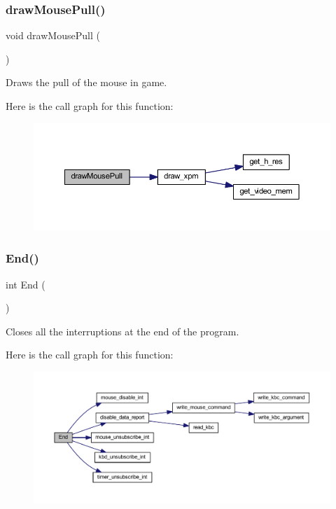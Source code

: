 \subsubsection{\texorpdfstring{drawMousePull()}{drawMousePull()}}
{\footnotesize\ttfamily void draw\+Mouse\+Pull (\begin{DoxyParamCaption}{ }\end{DoxyParamCaption})}



Draws the pull of the mouse in game. 

Here is the call graph for this function\+:
\nopagebreak
\begin{figure}[H]
\begin{center}
\leavevmode
\includegraphics[width=350pt]{group__game_ga072809b49225566117672a2ec734b2cc_cgraph}
\end{center}
\end{figure}
\mbox{\label{group__game_ga96a7acaf9d49759e564f941afcd87b68}} 
\subsubsection{\texorpdfstring{End()}{End()}}
{\footnotesize\ttfamily int End (\begin{DoxyParamCaption}{ }\end{DoxyParamCaption})}



Closes all the interruptions at the end of the program. 

Here is the call graph for this function\+:
\nopagebreak
\begin{figure}[H]
\begin{center}
\leavevmode
\includegraphics[width=350pt]{group__game_ga96a7acaf9d49759e564f941afcd87b68_cgraph}
\end{center}
\end{figure}
\mbox{\label{group__game_gaf4496cd5f0ca56890acbe30e9f10e438}} 
